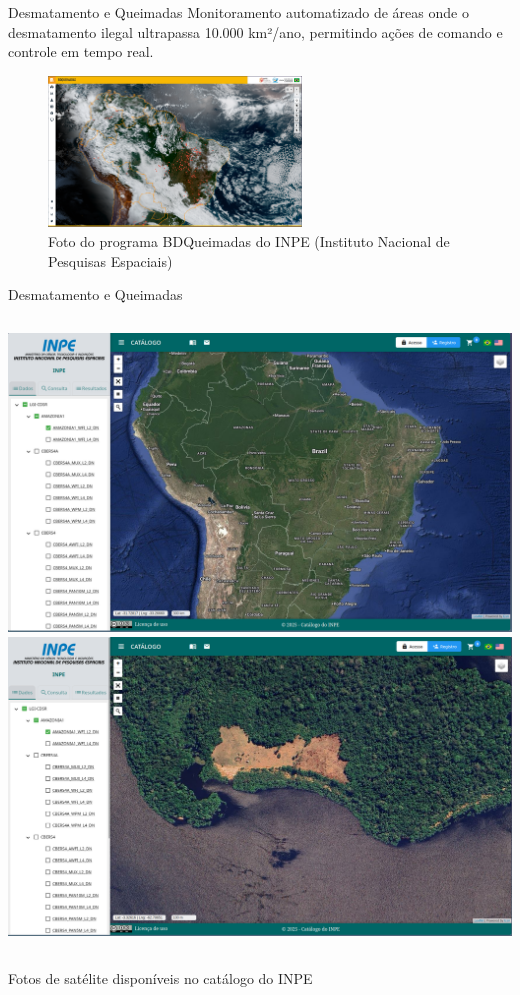 

\begin{frame}{Desmatamento e Queimadas}
  Monitoramento automatizado de áreas onde o desmatamento ilegal ultrapassa 10.000 km²/ano, permitindo ações de comando e controle em tempo real.
  \begin{figure}
    \centering
    \includegraphics[width=0.6\textwidth]{introducao/INPE_queimadas.png}
    \\
    \footnotesize Foto do programa BDQueimadas do INPE (Instituto Nacional de Pesquisas Espaciais)
  \end{figure}
\end{frame}

\begin{frame}{Desmatamento e Queimadas}
  \vspace{0.5em}
  \begin{columns}
      \includegraphics[width=\textwidth]{introducao/INPE_satelite1.png}
      \includegraphics[width=\textwidth]{introducao/INPE_satelite2.png}
  \end{columns}
  \vspace{0.5em}
  \centering
  \footnotesize Fotos de satélite disponíveis no catálogo do INPE
\end{frame}

